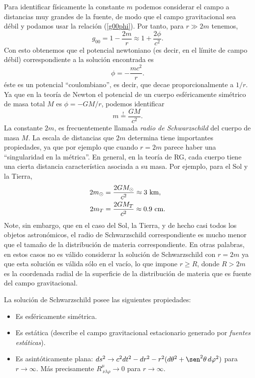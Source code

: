 Para identificar físicamente la constante $m$ podemos considerar el
campo a distancias muy grandes de la fuente, de modo que el campo
gravitacional sea débil y podamos usar la relación (\ref{g00phi}). Por
tanto, para $r\gg 2m$ tenemos,
\begin{equation}
g_{00}=1-\frac{2m}{r}\approx 1+\frac{2\phi}{c^2}.
\end{equation}
Con esto obtenemos que el potencial newtoniano (es decir, en el límite de
campo débil) correspondiente a la solución encontrada es
\begin{equation}
 \phi=-\frac{mc^2}{r}.
\end{equation}
éste es un potencial ``coulombiano'', es decir, que decae proporcionalmente a $1/r$. Ya que en la teoría de Newton el potencial de un cuerpo esféricamente  simétrico de masa total $M$ es $\phi=-{GM}/ {r}$, podemos identificar
\begin{equation}\label{masa_sch}
 \boxed{m\stackrel{!}{=}\frac{GM}{c^2}.}
\end{equation}
La constante $2m$, es frecuentemente llamada \textit{radio de Schwarzschild}
del cuerpo de masa $M$. La escala de distancias que $2m$ determina tiene importantes propiedades, ya que por ejemplo que cuando $r=2m$ parece haber una
 ``singularidad en la métrica''. En general, en la teoría de RG, cada cuerpo tiene una cierta distancia característica asociada a su masa. Por ejemplo, para el Sol y la Tierra,
\begin{align}
2m_{\odot} & =\frac{2GM_\odot}{c^2}\approx 3 {\rm\ km},\\
2m_{T} & =\frac{2GM_T	}{c^2}\approx 0.9{\rm \ cm}.
\end{align}
Note, sin embargo, que en el caso del Sol, la Tierra, y de hecho casi todos los objetos astronómicos, el radio de Schwarzschild correspondiente es mucho menor que el tamaño de la distribución de materia correspondiente. En otras palabras, en estos casos no es válido considerar la solución de Schwarzschild con $r=2m$ ya que esta solución es válida sólo en el vacío, lo que impone $r\ge R$, donde $R>2m$ es la coordenada radial de la superficie de la distribución de materia que es fuente del campo gravitacional.

La solución de Schwarzschild posee las siguientes propiedades:
\begin{itemize}
\item Es esféricamente simétrica.
\item Es estática (describe el campo gravitacional estacionario generado por \textit{fuentes estáticas}).
\item Es asintóticamente plana: $ds^2\to c^2dt^2-dr^2-r^2(d\theta^2+\sen^2\theta\,d\varphi^2)$ para $r\to\infty$. Más precisamente $R^\mu_{\ \nu\lambda\rho}\to 0$ para $r\to\infty$.
\end{itemize}



